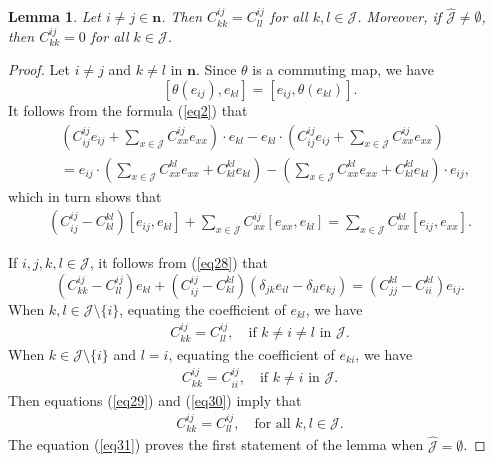 \documentclass[reqno]{amsart}
\theoremstyle{plain}
\newtheorem{lemma}[theorem]{Lemma}
\theoremstyle{definition}
\begin{document}
\begin{lemma}\label{l25}
 Let $i \neq j\in\mathbf{n}$. Then $C_{kk}^{ij} = C_{ll}^{ij}$ for all $k, l \in \mathcal{J}$.
Moreover, if $\hat{\mathcal{J}} \neq \emptyset$, then $C_{kk}^{ij} = 0$ for all $k \in \mathcal{J}$.
\end{lemma}
\begin{proof}
Let $i \neq j$ and $k \neq l$ in $\mathbf{n}$. Since $\theta$ is a commuting map,   we have
\[
[\theta(e_{ij}), e_{kl}] = [e_{ij}, \theta(e_{kl})].
\]
It follows from the formula (\ref{eq2}) that
\[
\begin{aligned}
&\left( C_{ij}^{ij} e_{ij} + \sum_{x \in \mathcal{J}} C_{xx}^{ij} e_{xx} \right) \cdot  e_{kl} - e_{kl} \cdot  \left( C_{ij}^{ij} e_{ij} + \sum_{x \in \mathcal{J}} C_{xx}^{ij} e_{xx} \right) \\
&= e_{ij} \cdot  \left( \sum_{x \in \mathcal{J}} C_{xx}^{kl} e_{xx} + C_{kl}^{kl} e_{kl} \right) - \left( \sum_{x \in \mathcal{J}} C_{xx}^{kl} e_{xx} + C_{kl}^{kl} e_{kl} \right) \cdot  e_{ij},
\end{aligned}
\]
which in turn shows that
 \begin{align}\label{eq28}
\left( C_{ij}^{ij} - C_{kl}^{kl} \right) [e_{ij}, e_{kl}] + \sum_{x \in \mathcal{J}} C_{xx}^{ij} [e_{xx}, e_{kl}] = \sum_{x \in \mathcal{J}} C_{xx}^{kl} [e_{ij}, e_{xx}]. 
 \end{align}

If $i, j, k, l \in \mathcal{J}$, it follows from (\ref{eq28}) that
\[
\left( C_{kk}^{ij} - C_{ll}^{ij} \right) e_{kl} + \left( C_{ij}^{ij} - C_{kl}^{kl} \right) \left( \delta_{jk} e_{il} - \delta_{il} e_{kj} \right) = \left( C_{jj}^{kl} - C_{ii}^{kl} \right) e_{ij}.
\]
When $k, l \in \mathcal{J} \setminus \{i\}$, equating the coefficient of $e_{kl}$, we have
 \begin{align}\label{eq29}
C_{kk}^{ij} = C_{ll}^{ij}, \quad \text{if } k \neq i \neq l \text{ in } \mathcal{J}.
 \end{align}
When $k \in \mathcal{J} \setminus \{i\}$ and $l = i$, equating the coefficient of $e_{ki}$, we have
 \begin{align}\label{eq30}
C_{kk}^{ij} = C_{ii}^{ij}, \quad \text{if } k \neq i \text{ in } \mathcal{J}.
 \end{align}
Then equations (\ref{eq29}) and (\ref{eq30}) imply that
 \begin{align}\label{eq31}
C_{kk}^{ij} = C_{ll}^{ij}, \quad \text{for all } k, l \in \mathcal{J}.
 \end{align}
The equation (\ref{eq31}) proves the first statement of the lemma when  $\hat{\mathcal{J}}= \emptyset$.


\end{proof}
\end{document}
